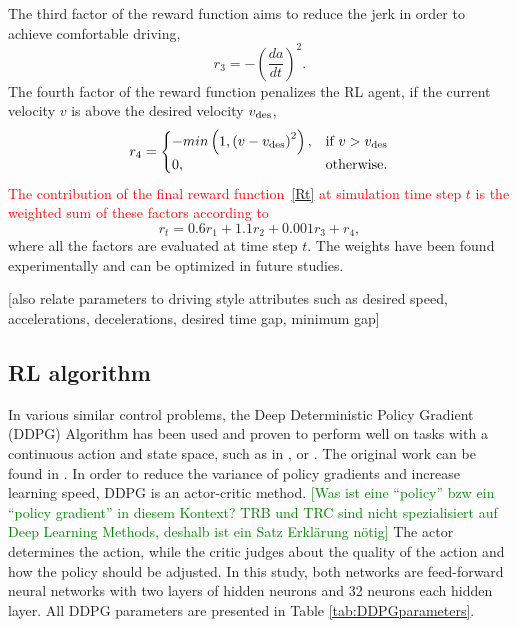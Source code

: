 \documentclass[review]{elsarticle}
\providecommand{\red}[1]{\textcolor{red}{#1}}
\providecommand{\green}[1]{\textcolor{green}{#1}}
\providecommand{\martin}[1]{\red{#1}} %
\providecommand{\martinc}[1]{\green{[#1]}} %
\providecommand{\3}{{\ss}}
\begin{document}
The third factor of the reward function aims to reduce the jerk in order to achieve comfortable driving,
\begin{equation}
r_3 = -\left(\dfrac{da}{dt}\right)^2.
\end{equation}
%
The fourth factor of the reward function penalizes the RL agent, if the current velocity $v$ is above the desired velocity $v_{\rm des}$,
\begin{equation}
r_4 =  
\begin{cases} 
 -min\left(1,\left( v - v_{\rm des}\right)^2\right), & \text{if } v>v_{\rm des}\\
0, & \text{otherwise.}
\end{cases}             
\end{equation}
%
\martin{The contribution of the final reward function~\eqref{Rt}  at simulation time step $t$ is the weighted
sum of these factors according to}
\begin{equation}
\label{rt}
r_t = 0.6r_1 + 1.1r_2 + 0.001 r_3 + r_4,
\end{equation}
where all the factors are evaluated at time step $t$. The weights have been found experimentally and can be optimized in future studies.

[also relate parameters to driving style attributes such as desired
speed, accelerations, decelerations, desired time gap, minimum gap]


\subsection{\label{RL-algorithm}RL algorithm}
In various similar control problems, the Deep Deterministic Policy
Gradient (DDPG) Algorithm has been used and proven to perform well on
tasks with a continuous action and state space, such as in
\cite{SafeEfficientAndComfortable}, \cite{ComparisonRLvsMPC} or
\cite{HumanLikeAutonomouCF}. The original work can be found in
\cite{DDPG}. In order to reduce the variance of policy gradients and
increase learning speed, DDPG is an actor-critic method. \martinc{Was
  ist eine ``policy'' bzw ein ``policy gradient'' in diesem Kontext? TRB und TRC sind nicht spezialisiert
  auf Deep Learning Methods, deshalb ist ein Satz Erkl\"arung n\"otig} The actor determines the action, while the critic judges about the quality of the action and how the policy should be adjusted. In this study, both networks are feed-forward neural networks with two layers of hidden neurons and 32 neurons each hidden layer. All DDPG parameters are presented in Table \ref{tab:DDPGparameters}.
\end{document}
